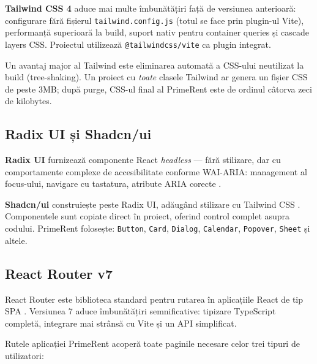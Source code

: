 \documentclass[12pt,a4paper,oneside]{report}
\begin{document}
\textbf{Tailwind CSS 4} aduce mai multe îmbunătățiri față de versiunea anterioară: configurare fără fișierul \texttt{tailwind.config.js} (totul se face prin plugin-ul Vite), performanță superioară la build, suport nativ pentru container queries și cascade layers CSS. Proiectul utilizează \texttt{@tailwindcss/vite} ca plugin integrat.

Un avantaj major al Tailwind este eliminarea automată a CSS-ului neutilizat la build (tree-shaking). Un proiect cu \textit{toate} clasele Tailwind ar genera un fișier CSS de peste 3MB; după purge, CSS-ul final al PrimeRent este de ordinul câtorva zeci de kilobytes.

\subsection{Radix UI și Shadcn/ui}

\textbf{Radix UI} furnizează componente React \textit{headless} — fără stilizare, dar cu comportamente complexe de accesibilitate conforme WAI-ARIA: management al focus-ului, navigare cu tastatura, atribute ARIA corecte \cite{radix}.

\textbf{Shadcn/ui} construiește peste Radix UI, adăugând stilizare cu Tailwind CSS \cite{shadcn}. Componentele sunt copiate direct în proiect, oferind control complet asupra codului. PrimeRent folosește: \texttt{Button}, \texttt{Card}, \texttt{Dialog}, \texttt{Calendar}, \texttt{Popover}, \texttt{Sheet} și altele.

\subsection{React Router v7}

React Router este biblioteca standard pentru rutarea în aplicațiile React de tip SPA \cite{reactrouter}. Versiunea 7 aduce îmbunătățiri semnificative: tipizare TypeScript completă, integrare mai strânsă cu Vite și un API simplificat.

Rutele aplicației PrimeRent acoperă toate paginile necesare celor trei tipuri de utilizatori:
\end{document}

